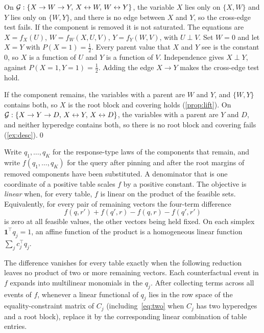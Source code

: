 \begin{example}
  On $\mathcal{G}:\{X\to W\to Y,\, X\leftrightarrow W,\, W\leftrightarrow Y\}$, the variable $X$ lies only on $\{X,W\}$ and $Y$ lies only on $\{W,Y\}$, and there is no edge between $X$ and $Y$, so the cross-edge test fails. If the component is removed it is not saturated. The equations are $X=f_X(U)$, $W=f_W(X,U,V)$, $Y=f_Y(W,V)$, with $U\perp V$. Set $W=0$ and let $X=Y$ with $P(X{=}1)=\tfrac12$. Every parent value that $X$ and $Y$ see is the constant $0$, so $X$ is a function of $U$ and $Y$ is a function of $V$. Independence gives $X\perp Y$, against $P(X{=}1,Y{=}1)=\tfrac12$. Adding the edge $X\to Y$ makes the cross-edge test hold.

  If the component remains, the variables with a parent are $W$ and $Y$, and $\{W,Y\}$ contains both, so $X$ is the root block and covering holds (\cref{prop:lift}). On $\mathcal{G}:\{X\to Y\to D,\, X\leftrightarrow Y,\, X\leftrightarrow D\}$, the variables with a parent are $Y$ and $D$, and neither hyperedge contains both, so there is no root block and covering fails (\cref{ex:desc}).\qed
\end{example}

\begin{definition}
  \label{def:linearity}
  Write $q_1,\ldots,q_K$ for the response-type laws of the components that remain, and write $f(q_1,\ldots,q_K)$ for the query after pinning and after the root margins of removed components have been substituted. A denominator that is one coordinate of a positive table scales $f$ by a positive constant. The objective is \emph{linear} when, for every table, $f$ is linear on the product of the feasible sets. Equivalently, for every pair of remaining vectors the four-term difference
  \begin{equation}
  \label{eq:four}
  f(q,r')+f(q',r)-f(q,r)-f(q',r')
  \end{equation}
  is zero at all feasible values, the other vectors being held fixed. On each simplex $\mathbf{1}^\top q_j=1$, an affine function of the product is a homogeneous linear function $\sum_j c_j^\top q_j$.

  The difference vanishes for every table exactly when the following reduction leaves no product of two or more remaining vectors. Each counterfactual event in $f$ expands into multilinear monomials in the $q_j$. After collecting terms across all events of $f$, whenever a linear functional of $q_j$ lies in the row space of the equality-constraint matrix of $C_j$ (including~\eqref{eq:two} when $C_j$ has two hyperedges and a root block), replace it by the corresponding linear combination of table entries.
\end{definition}

